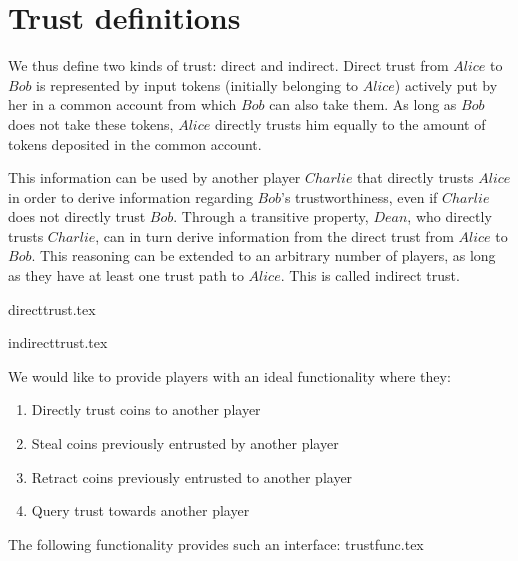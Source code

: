 \section{Trust definitions}
  We thus define two kinds of trust: direct and indirect. Direct trust from $Alice$ to $Bob$ is represented by input tokens
  (initially belonging to $Alice$) actively put by her in a common account from which $Bob$ can also take them. As long as
  $Bob$ does not take these tokens, $Alice$ directly trusts him equally to the amount of tokens deposited in the common
  account.
  
  This information can be used by another player $Charlie$ that directly trusts $Alice$ in order to derive information
  regarding $Bob$'s trustworthiness, even if $Charlie$ does not directly trust $Bob$. Through a transitive property, $Dean$,
  who directly trusts $Charlie$, can in turn derive information from the direct trust from $Alice$ to $Bob$. This reasoning can
  be extended to an arbitrary number of players, as long as they have at least one trust path to $Alice$. This is called
  indirect trust.

  {directtrust.tex}

  {indirecttrust.tex}

  We would like to provide players with an ideal functionality where they:
  \begin{enumerate}
    \item Directly trust coins to another player
    \item Steal coins previously entrusted by another player
    \item Retract coins previously entrusted to another player
    \item Query trust towards another player
  \end{enumerate}
  The following functionality provides such an interface:
  {trustfunc.tex}
